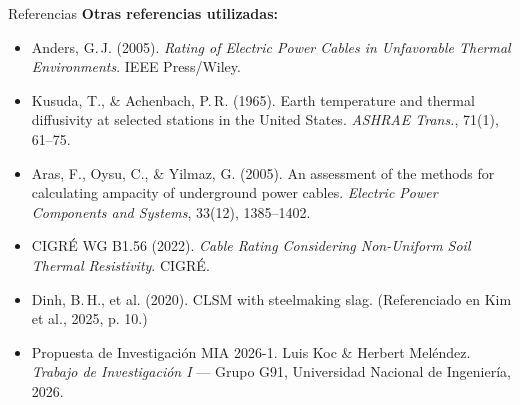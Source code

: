 \documentclass[aspectratio=169]{beamer}
\begin{document}
\begin{frame}[allowframebreaks]{Referencias}
\vspace{0.5em}
\textbf{Otras referencias utilizadas:}
\begin{itemize}[leftmargin=*]
  \item Anders, G.\,J. (2005). \textit{Rating of Electric Power Cables
        in Unfavorable Thermal Environments}. IEEE Press/Wiley.
  \item Kusuda, T., \& Achenbach, P.\,R. (1965). Earth temperature and
        thermal diffusivity at selected stations in the United States.
        \textit{ASHRAE Trans.}, 71(1), 61--75.
  \item Aras, F., Oysu, C., \& Yilmaz, G. (2005). An assessment of
        the methods for calculating ampacity of underground power cables.
        \textit{Electric Power Components and Systems}, 33(12), 1385--1402.
  \item CIGRÉ WG B1.56 (2022). \textit{Cable Rating Considering
        Non-Uniform Soil Thermal Resistivity}. CIGRÉ.
  \item Dinh, B.\,H., et al. (2020). CLSM with steelmaking slag.
        (Referenciado en Kim et al., 2025, p. 10.)
  \item Propuesta de Investigación MIA 2026-1. Luis Koc \& Herbert
        Meléndez. \textit{Trabajo de Investigación I} --- Grupo G91,
        Universidad Nacional de Ingeniería, 2026.
\end{itemize}
\end{frame}

\end{document}
